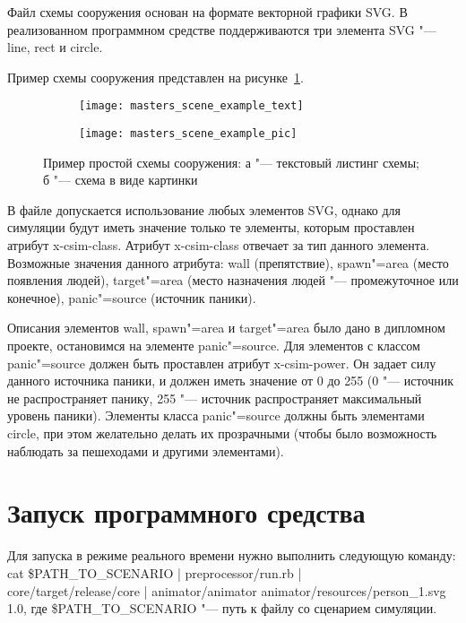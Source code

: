 Файл схемы сооружения основан на формате векторной графики SVG.
В реализованном программном средстве поддерживаются три элемента SVG "--- line, rect и circle.

Пример схемы сооружения представлен на рисунке~\ref{sec:manual:input:building_scheme:svg_listing}.

\begin{figure}[!ht]
  \centering
  \begin{subfigure}[!htb]{0.45\textwidth}
    \centering
    \texttt{[image: masters\_scene\_example\_text]}
    \caption{}
  \end{subfigure}
  \begin{subfigure}[!htb]{0.45\textwidth}
    \centering
    \texttt{[image: masters\_scene\_example\_pic]}
    \caption{}
  \end{subfigure}
  \caption{Пример простой схемы сооружения: а "--- текстовый листинг схемы;
           б "--- схема в виде картинки}
  \label{sec:manual:input:building_scheme:svg_listing}
\end{figure}

В файле допускается использование любых элементов SVG, однако для симуляции будут иметь значение только те элементы, которым проставлен атрибут x-csim-class.
Атрибут x-csim-class отвечает за тип данного элемента.  Возможные значения данного атрибута:
  wall (препятствие),
  spawn"=area (место появления людей),
  target"=area (место назначения людей "--- промежуточное или конечное),
  panic"=source (источник паники).

Описания элементов wall, spawn"=area и target"=area было дано в дипломном проекте, остановимся на элементе panic"=source.
Для элементов с классом panic"=source должен быть проставлен атрибут x-csim-power.
Он задает силу данного источника паники, и должен иметь значение от 0 до 255
(0 "--- источник не распространяет панику, 255 "--- источник распространяет максимальный уровень паники).
Элементы класса panic"=source должны быть элементами circle, при этом желательно делать их прозрачными
(чтобы было возможность наблюдать за пешеходами и другими элементами).

\section{Запуск программного средства}
\label{sec:manual:launch}

Для запуска в режиме реального времени нужно выполнить следующую команду:
cat \$PATH\_TO\_SCENARIO \-|\- preprocessor/run.rb \-|\- \\ core/target/release/core \-|\- animator/animator animator/resources/person\_1.svg 1.0,
где \$PATH\_TO\_SCENARIO "--- путь к файлу со сценарием симуляции.
